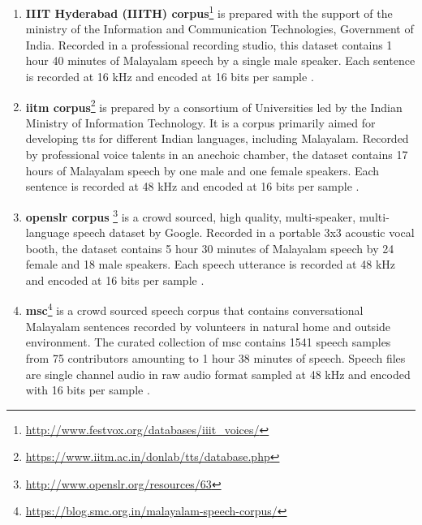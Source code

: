 \begin{enumerate}

	\item  \textbf{IIIT Hyderabad (IIITH) corpus}\footnote{\url{http://www.festvox.org/databases/iiit_voices/}} is prepared with the support of the ministry of the Information
	      and Communication Technologies, Government of India. Recorded in a professional recording studio, this dataset contains 1 hour 40 minutes of Malayalam speech by a single male speaker. Each sentence is recorded at 16 kHz and encoded  at 16 bits per sample \cite{prahallad2012iiit}.

	\item \textbf{ \Gls{iitm} corpus}\footnote{\url{https://www.iitm.ac.in/donlab/tts/database.php}} is prepared by a consortium of Universities led by the Indian Ministry of Information Technology. It is a corpus primarily aimed for developing \gls{tts} for different Indian languages, including Malayalam. Recorded by professional voice talents in an anechoic chamber, the dataset contains 17 hours of Malayalam speech by one male and one female speakers. Each sentence is recorded at 48 kHz and encoded  at 16 bits per sample \cite{baby2016resources}.

	\item \textbf{\Gls{openslr} corpus} \footnote{\url{http://www.openslr.org/resources/63}} is  a crowd sourced, high quality, multi-speaker, multi-language speech dataset by Google. Recorded in a  portable 3x3 acoustic vocal booth, the dataset contains 5 hour 30 minutes of Malayalam speech by 24 female and 18 male speakers. Each speech utterance  is recorded at 48 kHz and encoded  at 16 bits per sample \cite{he-etal-2020-open}. 

	\item  \textbf{\Gls{msc}}\footnote{\url{https://blog.smc.org.in/malayalam-speech-corpus/}}  is a crowd sourced speech corpus that contains conversational Malayalam sentences recorded by volunteers in natural home and outside environment. The curated collection of \gls{msc} contains 1541 speech samples from 75 contributors amounting to 1 hour 38 minutes of speech. Speech files are single channel audio in raw audio format sampled at 48 kHz and encoded with 16 bits per sample \cite{smcspeech}.


\end{enumerate}
